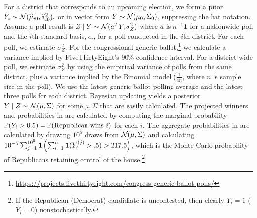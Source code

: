 \documentclass[12pt]{article}
\begin{document}
For a district that corresponds to an upcoming election, we form a prior 
$Y_i\sim \Norm(\hat \mu_{i0}, \hat \sigma_{i0}^2),$ or in vector form $
Y \sim \Norm( \mu_0,  \Sigma_0)$, suppressing the hat notation. Assume a poll result is $Z \mid Y \sim \Norm(a^T Y, \sigma^2_Z)$ where $a$ is $n^{-1}\bm 1$ for a nationwide poll and the $i$th standard basis, $e_i$, for a poll conducted in the $i$th district. For each poll, we estimate $\sigma^2_Z$. For the congressional generic ballot,\footnote{\url{https://projects.fivethirtyeight.com/congress-generic-ballot-polls/}} we calculate a variance implied by FiveThirtyEight's 90\% confidence interval. For a district-wide poll, we estimate $\sigma^2_Z$ by using the empirical variance of polls from the same district, plus a variance implied by the Binomial model ($\frac{1}{4n}$, where $n$ is sample size in the poll). We use the latest generic ballot polling average and the latest three polls for each district. Bayesian updating yields a posterior $Y \mid Z \sim \Norm(\mu, \Sigma)$ for some $\mu, \Sigma$ that are easily calculated. The projected winners and probabilities in  are calculated by computing the marginal probability $\P(Y_i > 0.5) = \P(\text{Republican wins $i$})$ for each $i$. The aggregate probabilities in  are calculated by drawing $10^5$ draws from $\Norm(\mu,\Sigma)$ and calculating $10^{-5}\sum_{j=1}^{10^5} \bm 1\pr{\sum_{i=1}^{n} \bm 1(Y_i^{(j)} > .5) > 217.5}$, which is the Monte Carlo probability of Republicans retaining control of the house.\footnote{If the Republican (Democrat) candidiate is uncontested, then clearly $Y_i = 1$ ($Y_i = 0$) nonstochastically.}

\newpage

\end{document}
